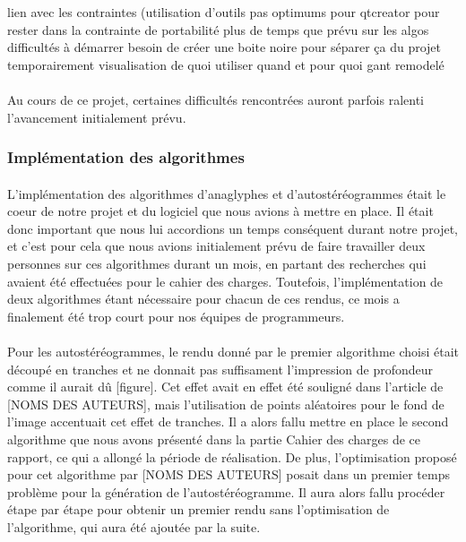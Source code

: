 lien avec les contraintes (utilisation d'outils pas optimums pour qtcreator pour rester dans la contrainte de portabilité
plus de temps que prévu sur les algos
difficultés à démarrer
besoin de créer une boite noire pour séparer ça du projet temporairement
visualisation de quoi utiliser quand et pour quoi
gant remodelé

\paragraph{}
Au cours de ce projet, certaines difficultés rencontrées auront parfois ralenti l'avancement initialement prévu.

\subsubsection{Implémentation des algorithmes}
\paragraph{}
L'implémentation des algorithmes d'anaglyphes et d'autostéréogrammes était le coeur de notre projet et du logiciel que nous avions à mettre en place. Il était donc important que nous lui accordions un temps conséquent durant notre projet, et c'est pour cela que nous avions initialement prévu de faire travailler deux personnes sur ces algorithmes durant un mois, en partant des recherches qui avaient été effectuées pour le cahier des charges. Toutefois, l'implémentation de deux algorithmes étant nécessaire pour chacun de ces rendus, ce mois a finalement été trop court pour nos équipes de programmeurs.

\paragraph{}
Pour les autostéréogrammes, le rendu donné par le premier algorithme choisi était découpé en tranches et ne donnait pas suffisament l'impression de profondeur comme il aurait dû [figure]. Cet effet avait en effet été souligné dans l'article de [NOMS DES AUTEURS], mais l'utilisation de points aléatoires pour le fond de l'image accentuait cet effet de tranches. 
Il a alors fallu mettre en place le second algorithme que nous avons présenté dans la partie Cahier des charges de ce rapport, ce qui a allongé la période de réalisation. De plus, l'optimisation proposé pour cet algorithme par [NOMS DES AUTEURS] posait dans un premier temps problème pour la génération de l'autostéréogramme. Il aura alors fallu procéder étape par étape pour obtenir un premier rendu sans l'optimisation de l'algorithme, qui aura été ajoutée par la suite.

